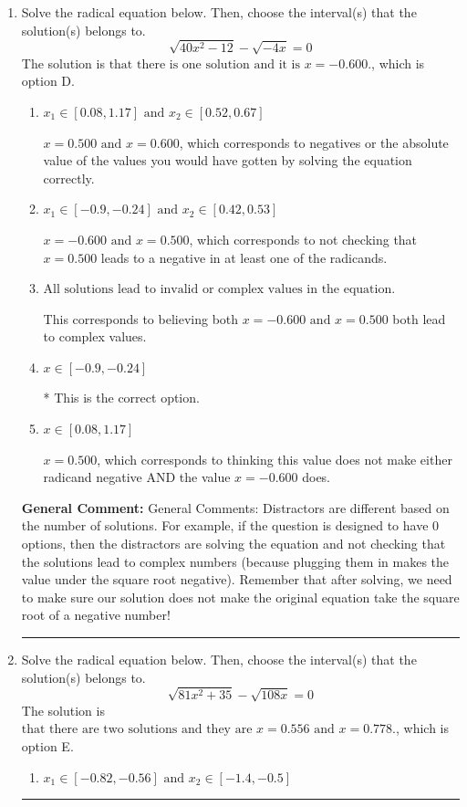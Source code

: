 \documentclass{extbook}[14pt]
\newcommand{\litem}[1]{\item #1

\rule{\textwidth}{0.4pt}}
\begin{document}
\begin{enumerate}\litem{
Solve the radical equation below. Then, choose the interval(s) that the solution(s) belongs to.
\[ \sqrt{40 x^2 - 12} - \sqrt{-4 x} = 0 \]The solution is \( \text{that there is one solution and it is } x = -0.600. \), which is option D.\begin{enumerate}[label=\Alph*.]
\item \( x_1 \in [0.08, 1.17] \text{ and } x_2 \in [0.52,0.67] \)

$x = 0.500 \text{ and } x = 0.600$, which corresponds to negatives or the absolute value of the values you would have gotten by solving the equation correctly.
\item \( x_1 \in [-0.9, -0.24] \text{ and } x_2 \in [0.42,0.53] \)

$x = -0.600 \text{ and } x = 0.500$, which corresponds to not checking that $x = 0.500$ leads to a negative in at least one of the radicands.
\item \( \text{All solutions lead to invalid or complex values in the equation.} \)

This corresponds to believing both $x = -0.600 \text{ and } x = 0.500$ both lead to complex values.
\item \( x \in [-0.9,-0.24] \)

* This is the correct option.
\item \( x \in [0.08,1.17] \)

$x = 0.500$, which corresponds to thinking this value does not make either radicand negative AND the value $x = -0.600$ does.
\end{enumerate}

\textbf{General Comment:} General Comments: Distractors are different based on the number of solutions. For example, if the question is designed to have 0 options, then the distractors are solving the equation and not checking that the solutions lead to complex numbers (because plugging them in makes the value under the square root negative). Remember that after solving, we need to make sure our solution does not make the original equation take the square root of a negative number!
}
\litem{
Solve the radical equation below. Then, choose the interval(s) that the solution(s) belongs to.
\[ \sqrt{81 x^2 + 35} - \sqrt{108 x} = 0 \]The solution is \( \text{that there are two solutions and they are } x = 0.556 \text{ and } x = 0.778. \), which is option E.\begin{enumerate}[label=\Alph*.]
\item \( x_1 \in [-0.82, -0.56] \text{ and } x_2 \in [-1.4,-0.5] \)


\end{enumerate}}
\end{enumerate}
\end{document}
